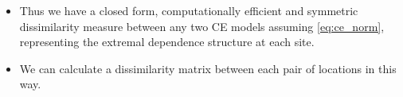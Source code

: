 \documentclass{article}
\numberwithin{equation}{section}
\begin{document}
\begin{itemize}
    \begin{align}
    JS^{G_{\alpha}}(P \mid\mid Q) = \frac{1}{2} \sum_{i=1}^n \Bigg[
        & \frac{\alpha \sigma_{1,i}^2 + (1 - \alpha) \sigma_{2,i}^2}{\sigma_{\alpha,i}^2} 
        + \log\left( \frac{\sigma_{\alpha,i}^2}{\sigma_{1,i}^{2\alpha} \sigma_{2,i}^{2(1 - \alpha)}} \right) \nonumber \\
        & + \alpha \frac{(\mu_{\alpha,i} - \mu_{1,i})^2}{\sigma_{\alpha,i}^2} 
        + (1 - \alpha) \frac{(\mu_{\alpha,i} - \mu_{2,i})^2}{\sigma_{\alpha,i}^2}
        - 1 \Bigg],
    \end{align}
where $\sigma_{\alpha, i}^2 = \frac{\sigma_{1, i}^2 \sigma_{2, i}^2}{\alpha\sigma_{1, i}^2 + (1 - \alpha)\sigma_{2, i}^2}$, and $\mu_{\alpha, i} = \sigma_{\alpha, i}^2 \left( \frac{\alpha\mu_{1, i}}{\sigma_{1, i}^2} + \frac{(1 - \alpha) \mu_{2, i}}{\sigma_{2, i}^2} \right)$, respectively.
\item Thus we have a closed form, computationally efficient and symmetric dissimilarity measure between any two CE models assuming \eqref{eq:ce_norm}, representing the extremal dependence structure at each site.
  \item We can calculate a dissimilarity matrix between each pair of locations in this way.
\end{itemize}

\end{document}
